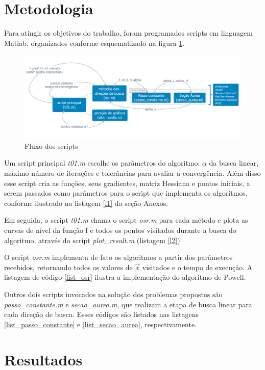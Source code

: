 \documentclass[10pt, a4paper]{article}
\begin{document}
\section{Metodologia}

Para atingir os objetivos do trabalho, foram programados scripts em linguagem Matlab, organizados conforme esquematizado na figura \ref{fig:fluxo}.

\begin{figure}[H]
      \centering
      \includegraphics[width=.9\textwidth]{t01.png}
      \caption{Fluxo dos scripts}
      \label{fig:fluxo}
\end{figure}

Um script principal \textit{t01.m} escolhe os par\^ametros do algoritmo: $\alpha$ da busca linear, m\'aximo n\'umero de itera\c c\~oes e toler\^ancias para avaliar a converg\^encia. Al\'em disso esse script cria as fun\c c\~oes, seus gradientes, matriz Hessiana e pontos iniciais, a serem passados como par\^ametros para o script que implementa os algoritmos, conforme ilustrado na listagem \ref{l1} da se\c c\~ao Anexos.

Em seguida, o script \textit{t01.m} chama o script \textit{osr.m} para cada m\'etodo e plota as curvas de n\'ivel da fun\c c\~ao f e todos os pontos visitados durante a busca do algoritmo, atrav\'es do script \textit{plot\_result.m} (listagem \ref{l2})

O script \textit{osr.m} implementa de fato os algoritmos a partir dos par\^ametros recebidos, retornando todos os valores de $\vec{x}$ visitados e o tempo de execu\c c\~ao. A listagem de c\'odigo \ref{list_osr} ilustra a implementa\c c\~ao do algoritmo de Powell.

Outros dois scripts invocados na solu\c c\~ao dos problemas propostos s\~ao \textit{passo\_constante.m} e \textit{secao\_aurea.m}, que realizam a etapa de busca linear para cada dire\c c\~ao de busca. Esses c\'odigos s\~ao listados nas listagens \ref{list_passo_constante} e \ref{list_secao_aurea}, respectivamente.

\section{Resultados}
\end{document}
